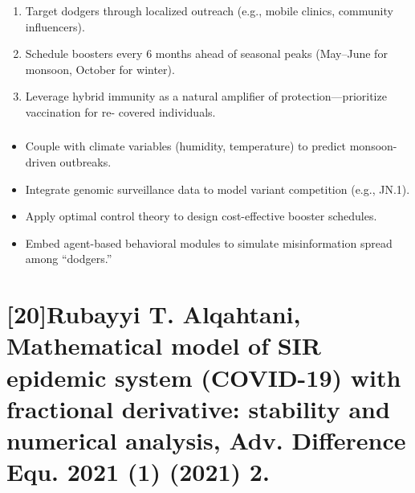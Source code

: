 \documentclass[10pt]{NSP1}
\begin{document}
\begin{enumerate}
  \item Target dodgers through localized outreach (e.g., mobile clinics, community influencers).
  \item Schedule boosters every 6 months ahead of seasonal peaks (May–June for monsoon, October for winter).
  \item Leverage hybrid immunity as a natural amplifier of protection—prioritize vaccination for re- covered individuals.
\end{enumerate}

\subsubsection*{}

\par\medskip{}\smallskip

\begin{itemize}
  \item Couple with climate variables (humidity, temperature) to predict monsoon-driven outbreaks.
  \item Integrate genomic surveillance data to model variant competition (e.g., JN.1).
  \item Apply optimal control theory to design cost-effective booster schedules.
  \item Embed agent-based behavioral modules to simulate misinformation spread among “dodgers.”
\end{itemize}

\section*{}

\par\vspace{0.1pt}\smallskip

\par\medskip{}\smallskip

\par\vspace{0.1pt}\smallskip

\section*{[20]Rubayyi T. Alqahtani, Mathematical model of SIR epidemic system (COVID-19) with fractional derivative: stability and numerical analysis, Adv. Difference Equ. 2021 (1) (2021) 2.}
\end{document}
